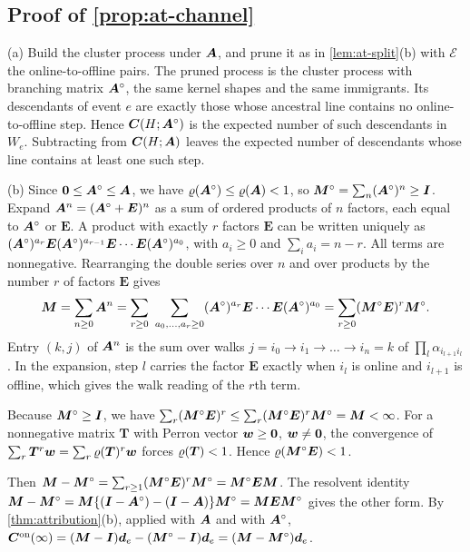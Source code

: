 \subsection{Proof of \texorpdfstring{\cref{prop:at-channel}}{the channel proposition}}\label{app:at-channel}

(a) Build the cluster process under $\bm{A}$, and prune it as in
\cref{lem:at-split}(b) with $\mathcal E$ the online-to-offline pairs. The pruned
process is the cluster process with branching matrix $\bm{A}^\circ$, the same kernel
shapes and the same immigrants. Its descendants of event $e$ are exactly those whose
ancestral line contains no online-to-offline step. Hence $\bm C(H;\bm{A}^\circ)$ is the
expected number of such descendants in $W_e$. Subtracting from $\bm C(H;\bm{A})$ leaves
the expected number of descendants whose line contains at least one such step.

(b) Since $\mathbf{0}\le\bm{A}^\circ\le\bm{A}$, we have $\varrho(\bm{A}^\circ)\le\varrho(\bm{A})<1$, so
$\bm{M}^\circ=\sum_n(\bm{A}^\circ)^n\ge\bm{I}$. Expand
$\bm{A}^n=(\bm{A}^\circ+\bm E)^n$ as a sum of ordered products of $n$ factors, each equal
to $\bm{A}^\circ$ or $\bm E$. A product with exactly $r$ factors $\bm E$ can be written
uniquely as
$(\bm{A}^\circ)^{a_r}\bm E(\bm{A}^\circ)^{a_{r-1}}\bm E\cdots\bm E(\bm{A}^\circ)^{a_0}$,
with $a_i\ge0$ and $\sum_ia_i=n-r$. All terms are nonnegative. Rearranging the double
series over $n$ and over products by the number $r$ of factors $\bm E$ gives
\[
\Mmat=\sum_{n\ge0}\Amat^n=\sum_{r\ge0}\ \sum_{a_0,\dots,a_r\ge0}
(\Amat^\circ)^{a_r}\bm E\cdots\bm E(\Amat^\circ)^{a_0}
=\sum_{r\ge0}(\Mmat^\circ\bm E)^r\Mmat^\circ .
\]
Entry $(k,j)$ of $\bm{A}^n$ is the sum over walks $j=i_0\to i_1\to\dots\to i_n=k$ of
$\prod_l\alpha_{i_{l+1}i_l}$. In the expansion, step $l$ carries the factor $\bm E$
exactly when $i_l$ is online and $i_{l+1}$ is offline, which gives the walk reading
of the $r$th term.

Because $\bm{M}^\circ\ge\bm{I}$, we have
$\sum_r(\bm{M}^\circ\bm E)^r\le\sum_r(\bm{M}^\circ\bm E)^r\bm{M}^\circ=\bm{M}<\infty$. For a
nonnegative matrix $\bm T$ with Perron vector $\bm w\ge\mathbf{0}$, $\bm w\neq\mathbf{0}$, the
convergence of $\sum_r\bm T^r\bm w=\sum_r\varrho(\bm T)^r\bm w$ forces $\varrho(\bm T)<1$.
Hence $\varrho(\bm{M}^\circ\bm E)<1$.

Then
$\bm{M}-\bm{M}^\circ=\sum_{r\ge1}(\bm{M}^\circ\bm E)^r\bm{M}^\circ=\bm{M}^\circ\bm E\bm{M}$.
The resolvent identity
$\bm{M}-\bm{M}^\circ=\bm{M}\{(\bm{I}-\bm{A}^\circ)-(\bm{I}-\bm{A})\}\bm{M}^\circ=\bm{M}\bm E\bm{M}^\circ$
gives the other form. By \cref{thm:attribution}(b), applied with $\bm{A}$ and with
$\bm{A}^\circ$,
$\bm C^{\mathrm{on}}(\infty)=(\bm{M}-\bm{I})\bm d_e-(\bm{M}^\circ-\bm{I})\bm d_e=(\bm{M}-\bm{M}^\circ)\bm d_e$.

